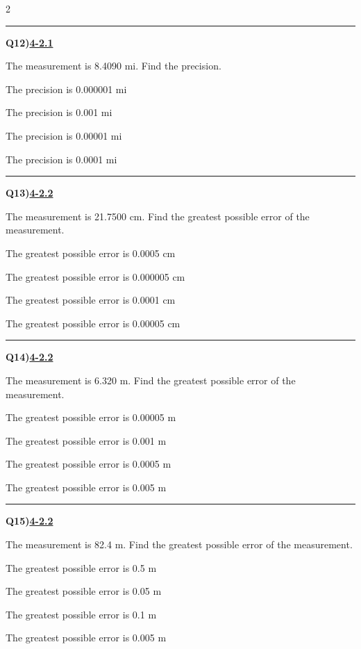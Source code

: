 \documentclass[11pt]{article}
\newenvironment{Qbox}[2]{%
  \par\medskip\noindent\begin{minipage}{\linewidth}%
  \hrule\medskip%
  \textbf{Q#1)}\hfill\textbf{\underline{#2}}\par\smallskip%
}{\par\end{minipage}\par\medskip}
\begin{document}
\begin{multicols}{2}
\begin{Qbox}{12}{4-2.1}
The measurement is 8.4090 mi. Find the precision.
\begin{choices}
  \item The precision is 0.000001 mi
  \item The precision is 0.001 mi
  \item The precision is 0.00001 mi
  \item The precision is 0.0001 mi
\end{choices}
\end{Qbox}

\begin{Qbox}{13}{4-2.2}
The measurement is 21.7500 cm. Find the greatest possible error of the measurement.
\begin{choices}
  \item The greatest possible error is 0.0005 cm
  \item The greatest possible error is 0.000005 cm
  \item The greatest possible error is 0.0001 cm
  \item The greatest possible error is 0.00005 cm
\end{choices}
\end{Qbox}

\begin{Qbox}{14}{4-2.2}
The measurement is 6.320 m. Find the greatest possible error of the measurement.
\begin{choices}
  \item The greatest possible error is 0.00005 m
  \item The greatest possible error is 0.001 m
  \item The greatest possible error is 0.0005 m
  \item The greatest possible error is 0.005 m
\end{choices}
\end{Qbox}

\begin{Qbox}{15}{4-2.2}
The measurement is 82.4 m. Find the greatest possible error of the measurement.
\begin{choices}
  \item The greatest possible error is 0.5 m
  \item The greatest possible error is 0.05 m
  \item The greatest possible error is 0.1 m
  \item The greatest possible error is 0.005 m
\end{choices}
\end{Qbox}


\end{multicols}
\end{document}
